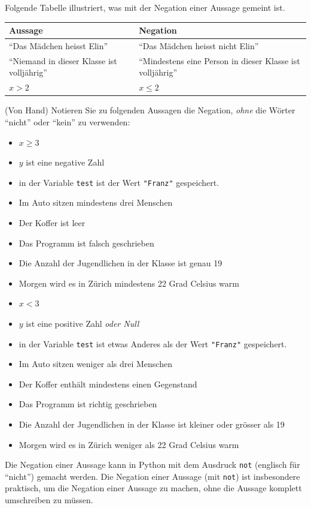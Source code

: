\begin{myexample} Folgende Tabelle illustriert, was mit der Negation einer Aussage gemeint ist.
\begin{table}[H]
	\centering
	\begin{tabular}{p{7cm}|p{7cm}}
		\textbf{Aussage}                            & \textbf{Negation}                                          \\\midrule\midrule
		``Das Mädchen heisst Elin''                 & ``Das Mädchen heisst nicht Elin''                          \\\midrule
		``Niemand in dieser Klasse ist volljährig'' & ``Mindestens eine Person in dieser Klasse ist volljährig'' \\\midrule
		$x > 2$                                     & $x \leq 2$
	\end{tabular}
\end{table}
\end{myexample}
\begin{myexercise}
	(Von Hand) Notieren Sie zu folgenden Aussagen die Negation, \textit{ohne} die Wörter ``nicht'' oder ``kein'' zu verwenden:
	\begin{itemize}
		\item $x \geq 3$
		\item $y$ ist eine negative Zahl
		\item in der Variable \lstinline|test| ist der Wert \lstinline|"Franz"| gespeichert.
		\item Im Auto sitzen mindestens drei Menschen
		\item Der Koffer ist leer
		\item Das Programm ist falsch geschrieben
		\item Die Anzahl der Jugendlichen in der Klasse ist genau 19
		\item Morgen wird es in Zürich mindestens 22 Grad Celsius warm
	\end{itemize}
	\begin{myanswer}
		\begin{itemize}
			\item $x < 3$
			\item $y$ ist eine positive Zahl \textit{oder Null}
			\item in der Variable \lstinline|test| ist etwas Anderes als der Wert \lstinline|"Franz"| gespeichert.
			\item Im Auto sitzen weniger als drei Menschen
			\item Der Koffer enthält mindestens einen Gegenstand
			\item Das Programm ist richtig geschrieben
			\item Die Anzahl der Jugendlichen in der Klasse ist kleiner oder grösser als 19
			\item Morgen wird es in Zürich weniger als 22 Grad Celsius warm
		\end{itemize}
	\end{myanswer}
\end{myexercise}
Die Negation einer Aussage kann in Python mit dem Ausdruck \lstinline|not| (englisch für ``nicht'') gemacht werden. Die Negation einer Aussage (mit \lstinline|not|) ist insbesondere praktisch, um die Negation einer Aussage zu machen, ohne die Aussage komplett umschreiben zu müssen.

